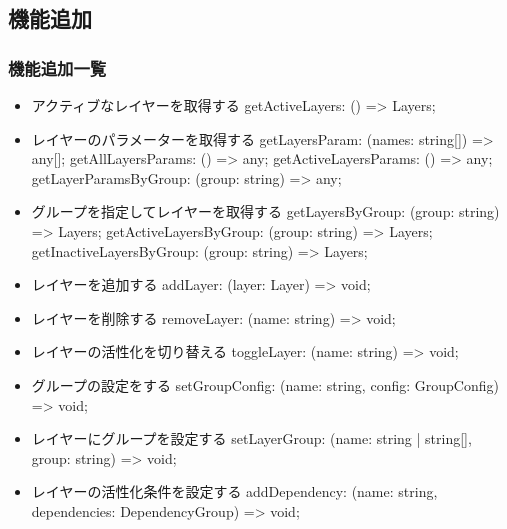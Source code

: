 \documentclass{jsarticle}
\begin{document}





\subsection{機能追加}

\subsubsection{機能追加一覧}

\begin{itemize}
	\item アクティブなレイヤーを取得する
		getActiveLayers: () => Layers;
	\item レイヤーのパラメーターを取得する
		getLayersParam: (names: string[]) => any[];
		getAllLayersParams: () => any;
		getActiveLayersParams: () => any;
		getLayerParamsByGroup: (group: string) => any;
	\item グループを指定してレイヤーを取得する
		getLayersByGroup: (group: string) => Layers;
		getActiveLayersByGroup: (group: string) => Layers;
		getInactiveLayersByGroup: (group: string) => Layers;


	\item レイヤーを追加する
		addLayer: (layer: Layer) => void;
	\item レイヤーを削除する
		removeLayer: (name: string) => void;
	\item レイヤーの活性化を切り替える
		toggleLayer: (name: string) => void;
	\item グループの設定をする
		setGroupConfig: (name: string, config: GroupConfig) => void;
	\item レイヤーにグループを設定する
		setLayerGroup: (name: string | string[], group: string) => void;
	\item レイヤーの活性化条件を設定する
		addDependency: (name: string, dependencies: DependencyGroup) => void;		
\end{itemize}
\end{document}
